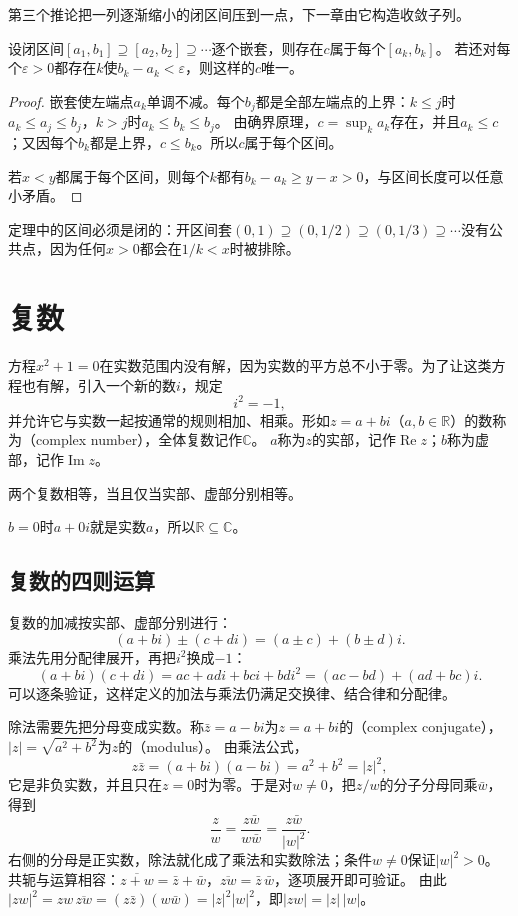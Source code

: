 第三个推论把一列逐渐缩小的闭区间压到一点，下一章由它构造收敛子列。
\begin{theorem}[闭区间套定理]
\label{thm:ru-nested-intervals}
设闭区间$[a_1,b_1]\supseteq[a_2,b_2]\supseteq\cdots$逐个嵌套，则存在$c$属于每个$[a_k,b_k]$。
若还对每个$\varepsilon>0$都存在$k$使$b_k-a_k<\varepsilon$，则这样的$c$唯一。
\end{theorem}
\begin{proof}
嵌套使左端点$a_k$单调不减。每个$b_j$都是全部左端点的上界：$k\leq j$时$a_k\leq a_j\leq b_j$，$k>j$时$a_k\leq b_k\leq b_j$。
由确界原理，$c=\sup_ka_k$存在，并且$a_k\leq c$；又因每个$b_k$都是上界，$c\leq b_k$。所以$c$属于每个区间。

若$x<y$都属于每个区间，则每个$k$都有$b_k-a_k\geq y-x>0$，与区间长度可以任意小矛盾。
\end{proof}
定理中的区间必须是闭的：开区间套$(0,1)\supseteq(0,1/2)\supseteq(0,1/3)\supseteq\cdots$没有公共点，因为任何$x>0$都会在$1/k<x$时被排除。
\section{复数}
\label{sec:ru-complex-numbers}

方程$x^2+1=0$在实数范围内没有解，因为实数的平方总不小于零。为了让这类方程也有解，引入一个新的数$i$，规定
\[
 i^2=-1,
\]
并允许它与实数一起按通常的规则相加、相乘。形如$z=a+bi$（$a,b\in\mathbb R$）的数称为（complex number），全体复数记作$\mathbb C$。
$a$称为$z$的实部，记作$\operatorname{Re}z$；$b$称为虚部，记作$\operatorname{Im}z$。

两个复数相等，当且仅当实部、虚部分别相等。

$b=0$时$a+0i$就是实数$a$，所以$\mathbb R\subseteq\mathbb C$。

\subsection{复数的四则运算}
\label{sec:ru-complex-arithmetic}

复数的加减按实部、虚部分别进行：
\[
 (a+bi)\pm(c+di)=(a\pm c)+(b\pm d)i.
\]
乘法先用分配律展开，再把$i^2$换成$-1$：
\[
 (a+bi)(c+di)=ac+adi+bci+bdi^2=(ac-bd)+(ad+bc)i.
\]
可以逐条验证，这样定义的加法与乘法仍满足交换律、结合律和分配律。

除法需要先把分母变成实数。称$\bar z=a-bi$为$z=a+bi$的（complex conjugate），$|z|=\sqrt{a^2+b^2}$为$z$的（modulus）。
由乘法公式，
\[
 z\bar z=(a+bi)(a-bi)=a^2+b^2=|z|^2,
\]
它是非负实数，并且只在$z=0$时为零。于是对$w\neq0$，把$z/w$的分子分母同乘$\bar w$，得到
\[
 \frac zw=\frac{z\bar w}{w\bar w}=\frac{z\bar w}{|w|^2}.
\]
右侧的分母是正实数，除法就化成了乘法和实数除法；条件$w\neq0$保证$|w|^2>0$。
共轭与运算相容：$\overline{z+w}=\bar z+\bar w$，$\overline{zw}=\bar z\,\bar w$，逐项展开即可验证。
由此$|zw|^2=zw\,\overline{zw}=(z\bar z)(w\bar w)=|z|^2|w|^2$，即$|zw|=|z|\,|w|$。

